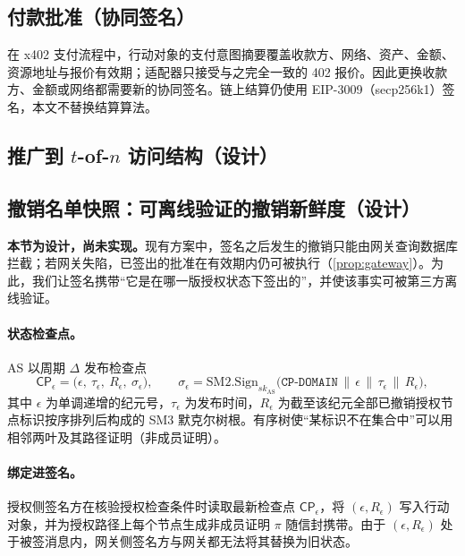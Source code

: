 \documentclass[UTF8,zihao=-4,a4paper]{ctexart}
\newif\ifshowguide
\newcommand{\guide}[1]{%
  \ifshowguide
  \begin{tcolorbox}[colback=gray!8,colframe=gray!45,boxrule=0.4pt,
      arc=1pt,left=4pt,right=4pt,top=2pt,bottom=2pt,fontupper=\small]
  \textbf{写作指引：}#1
  \end{tcolorbox}
  \fi}
\theoremstyle{plain}
\theoremstyle{definition}
\theoremstyle{remark}
\newcommand{\SMtwo}{\mathrm{SM2}}
\newcommand{\CP}{\mathsf{CP}}
\begin{document}
\subsection{付款批准（协同签名）}\label{sec:pay}
在 x402 支付流程中，行动对象的支付意图摘要覆盖收款方、网络、资产、金额、资源地址与报价有效期；适配器只接受与之完全一致的 402 报价。因此更换收款方、金额或网络都需要新的协同签名。链上结算仍使用 EIP-3009（secp256k1）签名，本文不替换结算算法。

\subsection{推广到 $t$-of-$n$ 访问结构（设计）}\label{sec:tofn}
\guide{这一小节是\textbf{设计}，标题和正文都要写明“尚未实现”。要点：（1）推广的目的是可用性，即某个参与方宕机时仍能签名；（2）为保证撤销不可绕过，授权侧签名方必须是必选方，访问结构为“授权侧签名方 $\wedge$（其余 $n-1$ 个参与方中任意 $t-1$ 个）”，而不是简单的 $t$-of-$n$；（3）对“授权侧签名方 $\wedge$（网关侧签名方 $\vee$ 审计方）”这一特例，可由网关侧签名方与审计方复制持有同一份额而复用两方协议；一般情形可基于\cite{liang2024,faster2025}实现，代价是引入同态加密或零知识证明；（4）若要求“未入账即无法执行”，审计方须为必选方，可扩展为三方乘法分享。}

\subsection{撤销名单快照：可离线验证的撤销新鲜度（设计）}\label{sec:freshness}
\textbf{本节为设计，尚未实现。}现有方案中，签名之后发生的撤销只能由网关查询数据库拦截；若网关失陷，已签出的批准在有效期内仍可被执行（\cref{prop:gateway}）。为此，我们让签名携带“它是在哪一版授权状态下签出的”，并使该事实可被第三方离线验证。

\paragraph{状态检查点。}AS 以周期 $\Delta$ 发布检查点
\[
\CP_\epsilon=\bigl(\epsilon,\ \tau_\epsilon,\ R_\epsilon,\ \sigma_\epsilon\bigr),\qquad
\sigma_\epsilon=\SMtwo.\mathrm{Sign}_{sk_{\mathrm{AS}}}\bigl(\texttt{CP-DOMAIN}\,\|\,\epsilon\,\|\,\tau_\epsilon\,\|\,R_\epsilon\bigr),
\]
其中 $\epsilon$ 为单调递增的纪元号，$\tau_\epsilon$ 为发布时间，$R_\epsilon$ 为截至该纪元全部已撤销授权节点标识按序排列后构成的 SM3 默克尔树根。有序树使“某标识不在集合中”可以用相邻两叶及其路径证明（非成员证明）。

\paragraph{绑定进签名。}授权侧签名方在核验授权检查条件时读取最新检查点 $\CP_\epsilon$，将 $(\epsilon,R_\epsilon)$ 写入行动对象，并为授权路径上每个节点生成非成员证明 $\pi$ 随信封携带。由于 $(\epsilon,R_\epsilon)$ 处于被签消息内，网关侧签名方与网关都无法将其替换为旧状态。
\end{document}
